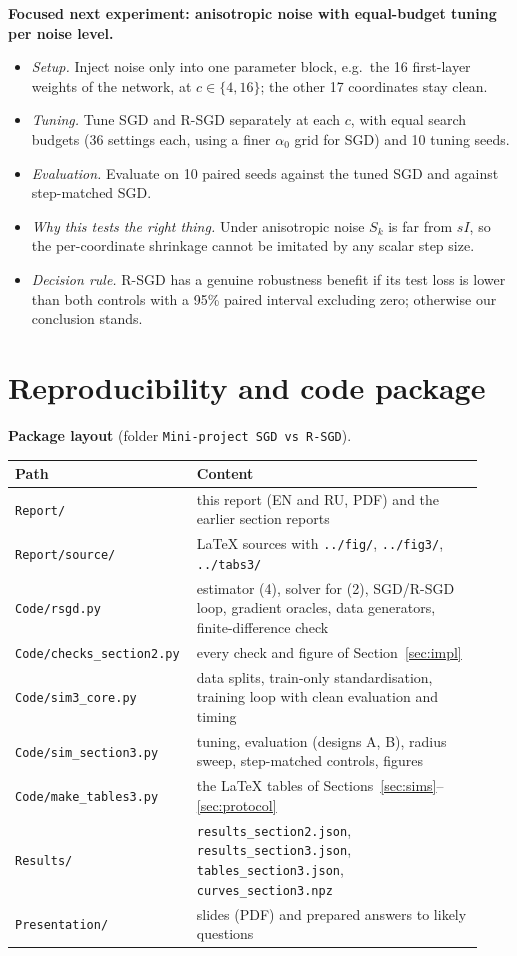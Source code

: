 \documentclass[11pt,a4paper]{article}
\begin{document}
\textbf{Focused next experiment: anisotropic noise with equal-budget tuning per noise level.}
\begin{itemize}
\item \emph{Setup.} Inject noise only into one parameter block, e.g.\ the 16 first-layer weights
of the network, at $c\in\{4,16\}$; the other 17 coordinates stay clean.
\item \emph{Tuning.} Tune SGD and R-SGD separately at each $c$, with equal search budgets (36
settings each, using a finer $\alpha_0$ grid for SGD) and 10 tuning seeds.
\item \emph{Evaluation.} Evaluate on 10 paired seeds against the tuned SGD and against step-matched
SGD.
\item \emph{Why this tests the right thing.} Under anisotropic noise $S_k$ is far from $sI$, so the
per-coordinate shrinkage cannot be imitated by any scalar step size.
\item \emph{Decision rule.} R-SGD has a genuine robustness benefit if its test loss is lower than
both controls with a 95\% paired interval excluding zero; otherwise our conclusion stands.
\end{itemize}


\section{Reproducibility and code package}\label{sec:repro}

\textbf{Package layout} (folder \texttt{Mini-project SGD vs R-SGD}).
\begin{center}
\small
\begin{tabular}{@{}p{0.33\linewidth}p{0.6\linewidth}@{}}
\toprule
Path & Content \\
\midrule
\texttt{Report/} & this report (EN and RU, PDF) and the earlier section reports \\
\texttt{Report/source/} & LaTeX sources with \texttt{../fig/}, \texttt{../fig3/}, \texttt{../tabs3/} \\
\texttt{Code/rsgd.py} & estimator (4), solver for (2), SGD/R-SGD loop, gradient oracles, data generators, finite-difference check \\
\texttt{Code/checks\_section2.py} & every check and figure of Section~\ref{sec:impl} \\
\texttt{Code/sim3\_core.py} & data splits, train-only standardisation, training loop with clean evaluation and timing \\
\texttt{Code/sim\_section3.py} & tuning, evaluation (designs A, B), radius sweep, step-matched controls, figures \\
\texttt{Code/make\_tables3.py} & the LaTeX tables of Sections~\ref{sec:sims}--\ref{sec:protocol} \\
\texttt{Results/} & \texttt{results\_section2.json}, \texttt{results\_section3.json}, \texttt{tables\_section3.json}, \texttt{curves\_section3.npz} \\
\texttt{Presentation/} & slides (PDF) and prepared answers to likely questions \\
\bottomrule
\end{tabular}
\end{center}
\end{document}
